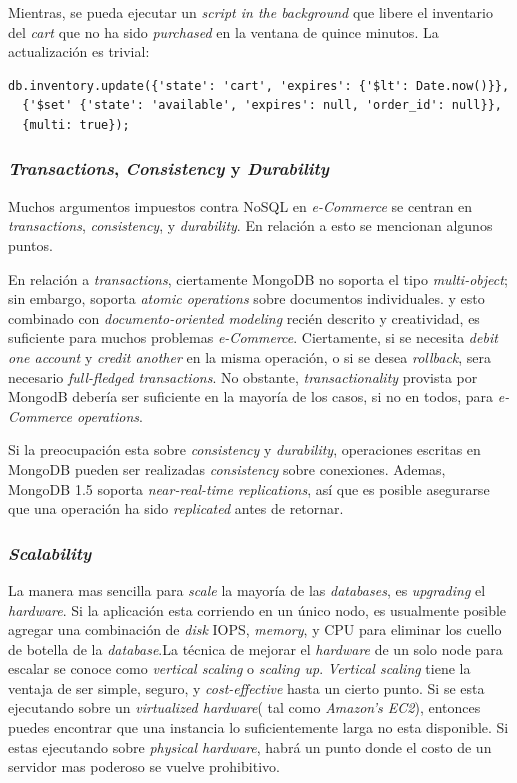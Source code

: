 Mientras, se pueda ejecutar un \textit{script in the background} que libere el inventario del \textit{cart} que no ha sido \textit{purchased} en la ventana de quince minutos. La actualización es trivial:

\begin{lstlisting}[caption= Ejemplo de \textit{atomic operation}.]
	db.inventory.update({'state': 'cart', 'expires': {'$lt': Date.now()}},
  {'$set' {'state': 'available', 'expires': null, 'order_id': null}},
  {multi: true});
\end{lstlisting} 

\subsubsection{\textit{Transactions}, \textit{Consistency} y \textit{Durability}}

Muchos argumentos impuestos contra NoSQL en \textit{e-Commerce} se centran en \textit{transactions}, \textit{consistency}, y \textit{durability}. En relación a esto se mencionan algunos puntos.

En relación a \textit{transactions}, ciertamente MongoDB no soporta el tipo \textit{multi-object}; sin embargo, soporta \textit{atomic operations} sobre documentos individuales. y esto combinado con \textit{documento-oriented modeling} recién descrito y creatividad, es suficiente para muchos problemas \textit{e-Commerce}. Ciertamente, si se necesita \textit{debit one account} y \textit{credit another} en la misma operación, o si se desea \textit{rollback}, sera necesario \textit{full-fledged transactions}. No obstante, \textit{transactionality} provista por MongodB debería ser suficiente en la mayoría de los casos, si no en todos, para \textit{e-Commerce operations}.

Si la preocupación esta sobre \textit{consistency} y \textit{durability}, operaciones escritas en MongoDB pueden ser realizadas \textit{consistency} sobre conexiones. Ademas, MongoDB 1.5 soporta \textit{near-real-time replications}, así que es posible asegurarse que una operación ha sido \textit{replicated} antes de retornar.

\subsubsection{\textit{Scalability}}
La manera mas sencilla para \textit{scale} la mayoría de las \textit{databases}, es \textit{upgrading} el \textit{hardware}. Si la aplicación esta corriendo en un único nodo, es usualmente posible agregar una combinación de \textit{disk} IOPS, \textit{memory}, y CPU para eliminar los cuello de botella de la \textit{database}.La técnica de mejorar el \textit{hardware} de un solo node para escalar se conoce como \textit{vertical scaling} o \textit{scaling up}. \textit{Vertical scaling} tiene la ventaja de ser simple, seguro, y \textit{cost-effective} hasta un cierto punto. Si se esta ejecutando sobre un \textit{virtualized hardware}( tal como \textit{Amazon's EC2}), entonces puedes encontrar que una instancia lo suficientemente larga no esta disponible. Si estas ejecutando sobre \textit{physical hardware}, habrá un punto donde el costo de un servidor mas poderoso se vuelve prohibitivo.

